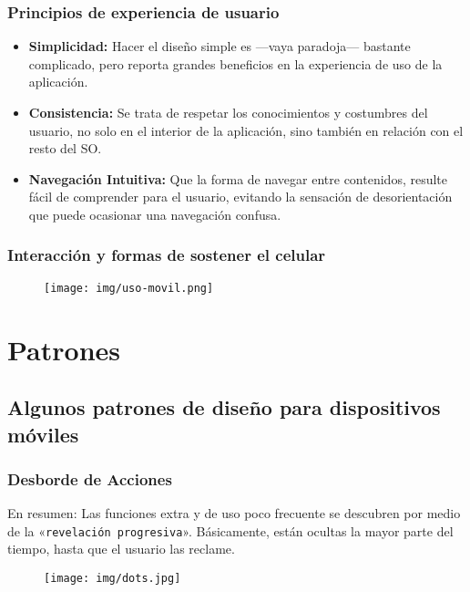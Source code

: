 \documentclass{beamer}
\begin{document}

\begin{frame}
\frametitle{Principios de experiencia de usuario}
\begin{itemize}

    \item \textbf{Simplicidad:} Hacer el diseño simple es —vaya paradoja— bastante complicado, pero reporta grandes beneficios en la experiencia de uso de la aplicación. \vspace{0.25cm}
    \item \textbf{Consistencia:} Se trata de respetar los conocimientos y costumbres del usuario, no solo en el interior de la aplicación, sino también en relación con el resto del SO. \vspace{0.25cm}
    \item \textbf{Navegación Intuitiva:} Que la forma de navegar entre contenidos, resulte fácil de comprender para el usuario, evitando la sensación de desorientación que puede ocasionar una navegación confusa.
\end{itemize}

\end{frame}


\begin{frame}
\frametitle{Interacción y formas de sostener el celular}

\begin{figure}[H]
  \centering
  \texttt{[image: img/uso-movil.png]}
\end{figure}

\end{frame}

\section{Patrones}
\subsection{Algunos patrones de diseño para dispositivos móviles}

\begin{frame}
\frametitle{Desborde de Acciones}

\begin{block}{En resumen:}
\justify
Las funciones extra y de uso poco frecuente se descubren por medio de la «\texttt{revelación progresiva}». Básicamente, están ocultas la mayor parte del tiempo, hasta que el usuario las reclame.
\end{block}

\begin{figure}[H]
  \centering
  \texttt{[image: img/dots.jpg]}
\end{figure}
\end{frame}
\end{document}
